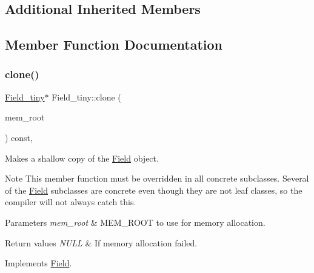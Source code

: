 \subsection*{Additional Inherited Members}


\subsection{Member Function Documentation}
\mbox{\label{classField__tiny_acbaf0f92950a7291a622f8c99b40adc9}} 
\subsubsection{\texorpdfstring{clone()}{clone()}\hspace{0.1cm}{\footnotesize\ttfamily [1/2]}}
{\footnotesize\ttfamily \mbox{\hyperlink{classField__tiny}{Field\+\_\+tiny}}$\ast$ Field\+\_\+tiny\+::clone (\begin{DoxyParamCaption}\item[{M\+E\+M\+\_\+\+R\+O\+OT $\ast$}]{mem\+\_\+root }\end{DoxyParamCaption}) const\hspace{0.3cm}{\ttfamily [inline]}, {\ttfamily [virtual]}}

Makes a shallow copy of the \mbox{\hyperlink{classField}{Field}} object.

\begin{DoxyNote}{Note}
This member function must be overridden in all concrete subclasses. Several of the \mbox{\hyperlink{classField}{Field}} subclasses are concrete even though they are not leaf classes, so the compiler will not always catch this.
\end{DoxyNote}

\begin{DoxyParams}{Parameters}
{\em mem\+\_\+root} & M\+E\+M\+\_\+\+R\+O\+OT to use for memory allocation. \\
\hline
\end{DoxyParams}

\begin{DoxyRetVals}{Return values}
{\em N\+U\+LL} & If memory allocation failed. \\
\hline
\end{DoxyRetVals}


Implements \mbox{\hyperlink{classField_a64979bcb9345803b031fff76a0c3d9fe}{Field}}.



